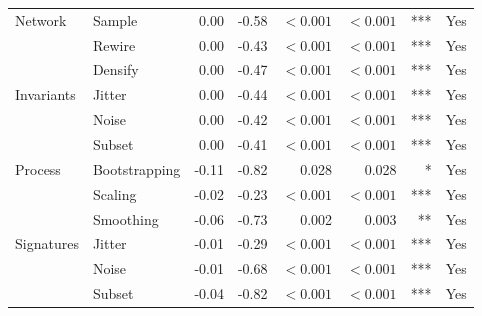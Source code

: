 \documentclass{article}
\begin{document}
\begin{table}[H]
\begin{tabularx}{\linewidth}{@{}l>{\raggedright\arraybackslash}Xrrrrrr@{}}
\midrule
Network & Sample & 0.00 & -0.58 & $<0.001$ & $<0.001$ & *** & Yes \\
 & Rewire & 0.00 & -0.43 & $<0.001$ & $<0.001$ & *** & Yes \\
 & Densify & 0.00 & -0.47 & $<0.001$ & $<0.001$ & *** & Yes \\
\addlinespace
Invariants & Jitter & 0.00 & -0.44 & $<0.001$ & $<0.001$ & *** & Yes \\
 & Noise & 0.00 & -0.42 & $<0.001$ & $<0.001$ & *** & Yes \\
 & Subset & 0.00 & -0.41 & $<0.001$ & $<0.001$ & *** & Yes \\
\addlinespace
Process & Bootstrapping & -0.11 & -0.82 & 0.028 & 0.028 & * & Yes \\
 & Scaling & -0.02 & -0.23 & $<0.001$ & $<0.001$ & *** & Yes \\
 & Smoothing & -0.06 & -0.73 & 0.002 & 0.003 & ** & Yes \\
\addlinespace
Signatures & Jitter & -0.01 & -0.29 & $<0.001$ & $<0.001$ & *** & Yes \\
 & Noise & -0.01 & -0.68 & $<0.001$ & $<0.001$ & *** & Yes \\
 & Subset & -0.04 & -0.82 & $<0.001$ & $<0.001$ & *** & Yes \\
\bottomrule
\end{tabularx}
\par\vspace{12pt}
\begin{minipage}{\linewidth}
\footnotesize

\end{minipage}
\end{table}
\end{document}
